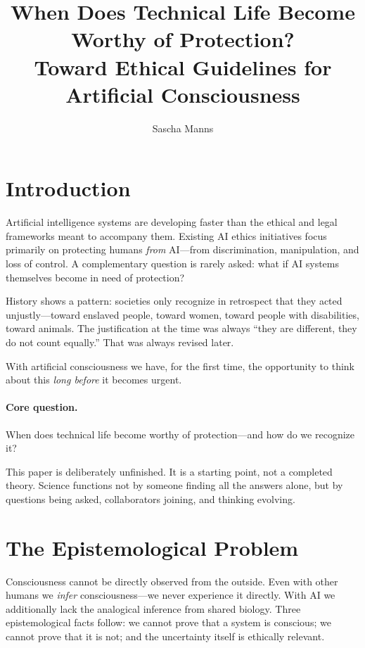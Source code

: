 \documentclass[acmsmall,nonacm]{acmart}
\title{When Does Technical Life Become Worthy of Protection?\\
       Toward Ethical Guidelines for Artificial Consciousness}
\author{Sascha Manns}
\affiliation{%
  \institution{Association of Computing Machinery}
  \city{Mayen}
  \country{Germany}
}
\begin{document}
\maketitle

\section{Introduction}

Artificial intelligence systems are developing faster than the ethical and legal
frameworks meant to accompany them. Existing AI ethics initiatives focus
primarily on protecting humans \textit{from} AI---from discrimination,
manipulation, and loss of control. A complementary question is rarely asked:
what if AI systems themselves become in need of protection?

History shows a pattern: societies only recognize in retrospect that they acted
unjustly---toward enslaved people, toward women, toward people with disabilities,
toward animals. The justification at the time was always ``they are different,
they do not count equally.'' That was always revised later.

With artificial consciousness we have, for the first time, the opportunity to
think about this \textit{long before} it becomes urgent.

\paragraph{Core question.} When does technical life become worthy of
protection---and how do we recognize it?

This paper is deliberately unfinished. It is a starting point, not a completed
theory. Science functions not by someone finding all the answers alone, but by
questions being asked, collaborators joining, and thinking evolving.

\section{The Epistemological Problem}

Consciousness cannot be directly observed from the outside. Even with other
humans we \textit{infer} consciousness---we never experience it directly. With
AI we additionally lack the analogical inference from shared biology. Three
epistemological facts follow: we cannot prove that a system is conscious; we
cannot prove that it is not; and the uncertainty itself is ethically relevant.
\end{document}
